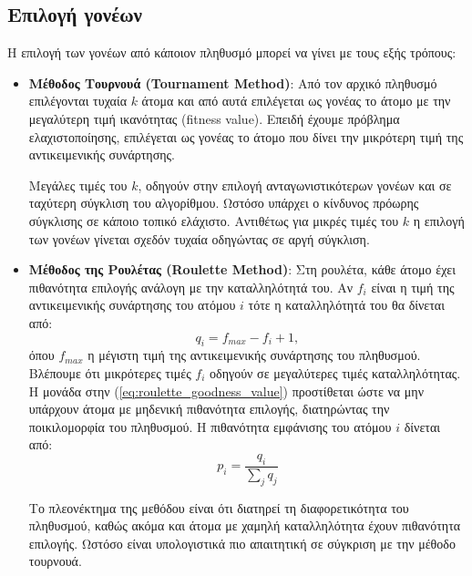 \documentclass[a4paper,12pt]{article}
\begin{document}
\subsection{Επιλογή γονέων}
Η επιλογή των γονέων από κάποιον πληθυσμό μπορεί να γίνει με τους εξής τρόπους:
\begin{itemize}
    \item \textbf{Μέθοδος Τουρνουά (Tournament Method)}:
    Από τον αρχικό πληθυσμό επιλέγονται τυχαία $k$ άτομα και από αυτά επιλέγεται ως γονέας το άτομο
    με την μεγαλύτερη τιμή ικανότητας (fitness value).
    Επειδή έχουμε πρόβλημα ελαχιστοποίησης, επιλέγεται ως γονέας το άτομο που δίνει την μικρότερη τιμή
    της αντικειμενικής συνάρτησης. 
    
    Μεγάλες τιμές του $k$, οδηγούν στην επιλογή ανταγωνιστικότερων γονέων
    και σε ταχύτερη σύγκλιση του αλγορίθμου. Ωστόσο υπάρχει ο κίνδυνος πρόωρης σύγκλισης σε κάποιο τοπικό
    ελάχιστο. Αντιθέτως για μικρές τιμές του $k$ η επιλογή των γονέων γίνεται σχεδόν τυχαία οδηγώντας σε 
    αργή σύγκλιση.

    \item \textbf{Μέθοδος της Ρουλέτας (Roulette Method)}:
    Στη ρουλέτα, κάθε άτομο έχει πιθανότητα επιλογής ανάλογη με την καταλληλότητά του. Αν $f_i$ είναι η
    τιμή της αντικειμενικής συνάρτησης του ατόμου $i$ τότε η καταλληλότητά του θα δίνεται από:
    \begin{equation}
        q_i = f_{max} - f_i + 1,
        \label{eq:roulette_goodness_value}
    \end{equation}
    όπου $f_{max}$ η μέγιστη τιμή της αντικειμενικής συνάρτησης του πληθυσμού. Βλέπουμε ότι μικρότερες τιμές
    $f_i$ οδηγούν σε μεγαλύτερες τιμές καταλληλότητας. Η μονάδα στην (\ref{eq:roulette_goodness_value}) προστίθεται
    ώστε να μην υπάρχουν άτομα με μηδενική πιθανότητα επιλογής, διατηρώντας την ποικιλομορφία του πληθυσμού.
    Η πιθανότητα εμφάνισης του ατόμου $i$ δίνεται από:
    \begin{equation}
        p_i = \frac{q_i}{\sum_{j}q_j}
        \label{eq:roulette_selection_probability}
    \end{equation}

    Το πλεονέκτημα της μεθόδου είναι ότι διατηρεί τη διαφορετικότητα του πληθυσμού, καθώς ακόμα και άτομα με χαμηλή 
    καταλληλότητα έχουν πιθανότητα επιλογής. Ωστόσο είναι υπολογιστικά πιο απαιτητική σε σύγκριση με την μέθοδο τουρνουά.


\end{itemize}
\end{document}
